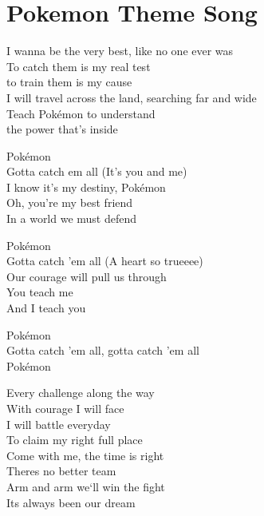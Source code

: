 \section{Pokemon Theme Song}

I wanna be the very best, like no one ever was\\
To catch them is my real test\\
to train them is my cause\\
I will travel across the land, searching far and wide\\
Teach Pokémon to understand\\
the power that's inside 

Pokémon\\
Gotta catch em all (It's you and me)\\
I know it's my destiny, Pokémon\\
Oh, you're my best friend\\
In a world we must defend

Pokémon\\
Gotta catch 'em all (A heart so trueeee)\\
Our courage will pull us through\\
You teach me\\
And I teach you

Pokémon\\
Gotta catch 'em all, gotta catch 'em all\\
Pokémon

Every challenge along the way\\
With courage I will face\\
I will battle everyday\\
To claim my right full place\\
Come with me, the time is right\\
Theres no better team\\
Arm and arm we`ll win the fight\\
Its always been our dream
